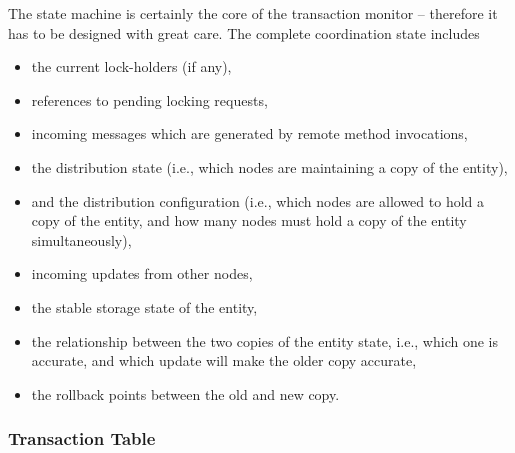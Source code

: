 \documentclass[a4paper, 10pt]{book}
\begin{document}
                                The state machine is certainly the core of the transaction monitor --
                                therefore it has to be designed with great care.
                                The complete coordination state includes 
                                \begin{itemize}
                                    \item the current lock-holders (if any),
                                    \item references to pending locking requests, 
                                    \item incoming messages which are generated by remote method invocations, 
                                    \item the distribution state (i.e., which nodes are maintaining a
                                        copy of the entity),
                                    \item and the distribution configuration (i.e., which nodes are
                                        allowed to hold a copy of the entity, and how many nodes must hold a
                                        copy of the entity simultaneously),
                                    \item incoming updates from other nodes,
                                    \item the stable storage state of the entity,
                                    \item the relationship between the two copies of the entity state,
                                        i.e., which one is accurate, and which update will make the
                                        older copy accurate,
                                    \item the rollback points between the old and new copy.
                                \end{itemize}


                                \subsubsection{Transaction Table}
\end{document}
